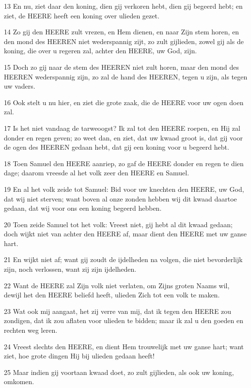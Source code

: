 \par 13 En nu, ziet daar den koning, dien gij verkoren hebt, dien gij begeerd hebt; en ziet, de HEERE heeft een koning over ulieden gezet.
\par 14 Zo gij den HEERE zult vrezen, en Hem dienen, en naar Zijn stem horen, en den mond des HEEREN niet wederspannig zijt, zo zult gijlieden, zowel gij als de koning, die over u regeren zal, achter den HEERE, uw God, zijn.
\par 15 Doch zo gij naar de stem des HEEREN niet zult horen, maar den mond des HEEREN wederspannig zijn, zo zal de hand des HEEREN, tegen u zijn, als tegen uw vaders.
\par 16 Ook stelt u nu hier, en ziet die grote zaak, die de HEERE voor uw ogen doen zal.
\par 17 Is het niet vandaag de tarweoogst? Ik zal tot den HEERE roepen, en Hij zal donder en regen geven; zo weet dan, en ziet, dat uw kwaad groot is, dat gij voor de ogen des HEEREN gedaan hebt, dat gij een koning voor u begeerd hebt.
\par 18 Toen Samuel den HEERE aanriep, zo gaf de HEERE donder en regen te dien dage; daarom vreesde al het volk zeer den HEERE en Samuel.
\par 19 En al het volk zeide tot Samuel: Bid voor uw knechten den HEERE, uw God, dat wij niet sterven; want boven al onze zonden hebben wij dit kwaad daartoe gedaan, dat wij voor ons een koning begeerd hebben.
\par 20 Toen zeide Samuel tot het volk: Vreest niet, gij hebt al dit kwaad gedaan; doch wijkt niet van achter den HEERE af, maar dient den HEERE met uw ganse hart.
\par 21 En wijkt niet af; want gij zoudt de ijdelheden na volgen, die niet bevorderlijk zijn, noch verlossen, want zij zijn ijdelheden.
\par 22 Want de HEERE zal Zijn volk niet verlaten, om Zijns groten Naams wil, dewijl het den HEERE beliefd heeft, ulieden Zich tot een volk te maken.
\par 23 Wat ook mij aangaat, het zij verre van mij, dat ik tegen den HEERE zou zondigen, dat ik zou aflaten voor ulieden te bidden; maar ik zal u den goeden en rechten weg leren.
\par 24 Vreest slechts den HEERE, en dient Hem trouwelijk met uw ganse hart; want ziet, hoe grote dingen Hij bij ulieden gedaan heeft!
\par 25 Maar indien gij voortaan kwaad doet, zo zult gijlieden, als ook uw koning, omkomen.


